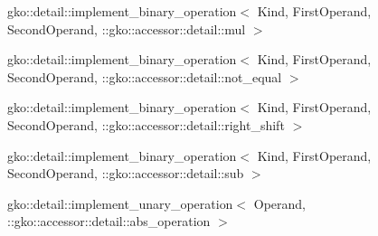 \begin{DoxyCompactList}
\begin{DoxyCompactList}
\item {}
\end{DoxyCompactList}
\item gko\+:\+:detail\+:\+:implement\+\_\+binary\+\_\+operation$<$ Kind, First\+Operand, Second\+Operand, \+:\+:gko\+:\+:accessor\+:\+:detail\+:\+:mul $>$\begin{DoxyCompactList}
\item {}
\end{DoxyCompactList}
\item gko\+:\+:detail\+:\+:implement\+\_\+binary\+\_\+operation$<$ Kind, First\+Operand, Second\+Operand, \+:\+:gko\+:\+:accessor\+:\+:detail\+:\+:not\+\_\+equal $>$\begin{DoxyCompactList}
\item {}
\end{DoxyCompactList}
\item gko\+:\+:detail\+:\+:implement\+\_\+binary\+\_\+operation$<$ Kind, First\+Operand, Second\+Operand, \+:\+:gko\+:\+:accessor\+:\+:detail\+:\+:right\+\_\+shift $>$\begin{DoxyCompactList}
\item {}
\end{DoxyCompactList}
\item gko\+:\+:detail\+:\+:implement\+\_\+binary\+\_\+operation$<$ Kind, First\+Operand, Second\+Operand, \+:\+:gko\+:\+:accessor\+:\+:detail\+:\+:sub $>$\begin{DoxyCompactList}
\item {}
\end{DoxyCompactList}
\item gko\+:\+:detail\+:\+:implement\+\_\+unary\+\_\+operation$<$ Operand, \+:\+:gko\+:\+:accessor\+:\+:detail\+:\+:abs\+\_\+operation $>$\begin{DoxyCompactList}
\item {}

\end{DoxyCompactList}
\end{DoxyCompactList}
